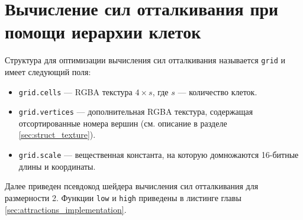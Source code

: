 \section{Вычисление сил отталкивания при помощи иерархии клеток}

Структура для оптимизации вычисления сил отталкивания называется \texttt{grid} и имеет следующий поля:

\begin{itemize}
\item \texttt{grid.cells} --- RGBA текстура $4\times s$, где $s$ --- количество клеток.
\item \texttt{grid.vertices} --- дополнительная RGBA текстура, содержащая отсортированные номера вершин (см. описание в разделе \ref{sec:struct_texture}).
\item \texttt{grid.scale} --- вещественная константа, на которую домножаются 16-битные длины и координаты.
\end{itemize}

Далее приведен псевдокод шейдера вычисления сил отталкивания для размерности 2. Функции \texttt{low} и \texttt{high} приведены в листинге главы \ref{sec:attractions_implementation}.

